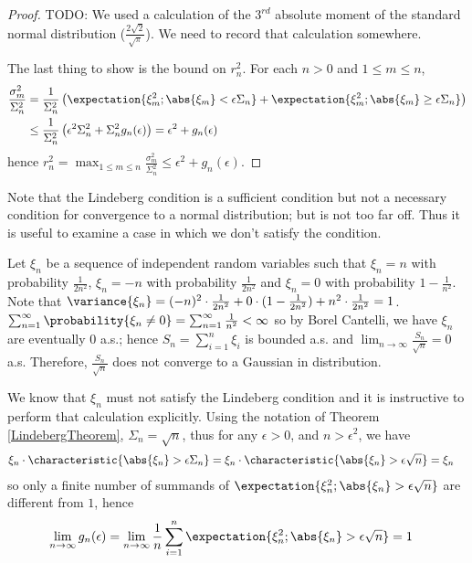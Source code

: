 \begin{proof}
TODO: We used a calculation of the $3^{rd}$ absolute moment of the
standard normal distribution ($\frac{2\sqrt{2}}{\sqrt{\pi}}$).  We need to record that calculation somewhere.

The last thing to show is the bound on $r_n^2$.  For each $n >0$ and
$1 \leq m \leq n$,
\begin{align*}
\frac{\sigma_m^2}{\Sigma_n^2} &= \frac{1}{\Sigma_n^2} \left(
  \expectation{\xi_m^2 ; \abs{\xi_m} < \epsilon \Sigma_n} +
  \expectation{\xi_m^2 ; \abs{\xi_m} \geq \epsilon \Sigma_n} \right) \\
&\leq \frac{1}{\Sigma_n^2} \left(\epsilon^2 \Sigma_n^2 + \Sigma_n^2
  g_n(\epsilon) \right) = \epsilon^2 + g_n(\epsilon)
\end{align*}
hence $r_n^2 = \max_{1\leq m \leq n} \frac{\sigma_m^2}{\Sigma_n^2}
\leq \epsilon^2 + g_n(\epsilon)$.
\end{proof}

Note that the Lindeberg condition is a sufficient condition but not a
necessary condition for convergence to a normal distribution; but is
not too far off.  Thus it is useful to examine a case in which we
don't satisfy the condition.
\begin{examp}Let $\xi_n$ be a sequence
  of independent random
  variables such that $\xi_n = n$ with probability $\frac{1}{2n^2}$, $\xi_n =
  -n$ with probability $\frac{1}{2n^2}$ and $\xi_n = 0$ with
  probability $1-\frac{1}{n^2}$.  Note that $\variance{\xi_n} =
  (-n)^2 \cdot \frac{1}{2n^2} + 0 \cdot (1 - \frac{1}{2n^2}) +  n^2 \cdot
  \frac{1}{2n^2} = 1$.  
$\sum_{n=1}^\infty
  \probability{\xi_n \neq 0} = \sum_{n=1}^\infty \frac{1}{n^2} <
  \infty$ so by Borel Cantelli, we have $\xi_n$ are eventually $0$
  a.s.; hence $S_n = \sum_{i=1}^n \xi_i$ is bounded a.s. and $\lim_{n
    \to \infty} \frac{S_n}{\sqrt{n}} = 0$ a.s.  Therefore,
  $\frac{S_n}{\sqrt{n}}$ does not converge to a Gaussian in
  distribution.

We know that $\xi_n$ must not satisfy the Lindeberg condition and it
is instructive to perform that calculation explicitly.  Using the
notation of Theorem \ref{LindebergTheorem}, $\Sigma_n = \sqrt{n}$,
thus for any $\epsilon >
0$, and $n > \epsilon^2$, we have 
\begin{align*}
\xi_n \cdot \characteristic{\abs{\xi_n} >
  \epsilon \Sigma_n} &= \xi_n \cdot \characteristic{\abs{\xi_n} >
  \epsilon \sqrt{n}} = \xi_n
\end{align*}
so only a finite number of summands of $\expectation{ \xi_n^2 ;
  \abs{\xi_n} >  \epsilon \sqrt{n}}$ are different from $1$, hence
\begin{align*}
\lim_{n \to \infty} g_n(\epsilon) &=\lim_{n \to \infty} \frac{1}{n} \sum_{i=1}^n \expectation{ \xi_n^2 ;
  \abs{\xi_n} >  \epsilon \sqrt{n}} = 1
\end{align*}
\end{examp}

